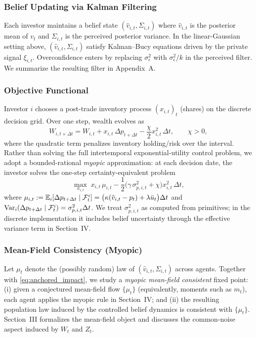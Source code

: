 \subsubsection{Belief Updating via Kalman Filtering}

Each investor maintains a belief state $(\hat v_{i,t},\Sigma_{i,t})$ where $\hat v_{i,t}$ is the posterior mean of $v_t$ and $\Sigma_{i,t}$ is the perceived posterior variance. In the linear-Gaussian setting above, $(\hat v_{i,t},\Sigma_{i,t})$ satisfy Kalman--Bucy equations driven by the private signal $\xi_{i,t}$. Overconfidence enters by replacing $\sigma_\epsilon^2$ with $\sigma_\epsilon^2/k$ in the perceived filter. We summarize the resulting filter in Appendix~A.

\subsubsection{Objective Functional}

Investor $i$ chooses a post-trade inventory process $(x_{i,t})_{t}$ (shares) on the discrete decision grid.
Over one step, wealth evolves as
\[
W_{i,t+\Delta t} = W_{i,t} + x_{i,t}\,\Delta p_{t+\Delta t} - \frac{\chi}{2}x_{i,t}^2\,\Delta t,
\qquad \chi>0,
\]
where the quadratic term penalizes inventory holding/risk over the interval.
Rather than solving the full intertemporal exponential-utility control problem, we adopt a bounded-rational \emph{myopic} approximation: at each decision date, the investor solves the one-step certainty-equivalent problem
\[
\max_{x_{i,t}}\;
x_{i,t}\,\mu_{i,t}
- \frac12\big(\gamma\,\sigma^2_{p,i,t}+\chi\big)x_{i,t}^2\,\Delta t,
\]
where
$\mu_{i,t}:=\mathbb{E}_i[\Delta p_{t+\Delta t}\mid\mathcal F^i_t]=\big(\kappa(\hat v_{i,t}-p_t)+\lambda\bar u_t\big)\Delta t$
and $\text{Var}_i(\Delta p_{t+\Delta t}\mid\mathcal F^i_t)=\sigma^2_{p,i,t}\Delta t$.
We treat $\sigma^2_{p,i,t}$ as computed from primitives; in the discrete implementation it includes belief uncertainty through the effective variance term in Section~IV.

\subsubsection{Mean-Field Consistency (Myopic)}

Let $\mu_t$ denote the (possibly random) law of $(\hat v_{i,t},\Sigma_{i,t})$ across agents. Together with \eqref{eq:anchored_impact}, we study a \emph{myopic mean-field consistent} fixed point: (i) given a conjectured mean-field flow $\{\mu_t\}$ (equivalently, moments such as $m_t$), each agent applies the myopic \CARA rule in Section~IV; and (ii) the resulting population law induced by the controlled belief dynamics is consistent with $\{\mu_t\}$. Section~III formalizes the mean-field object and discusses the common-noise aspect induced by $W_t$ and $Z_t$.
